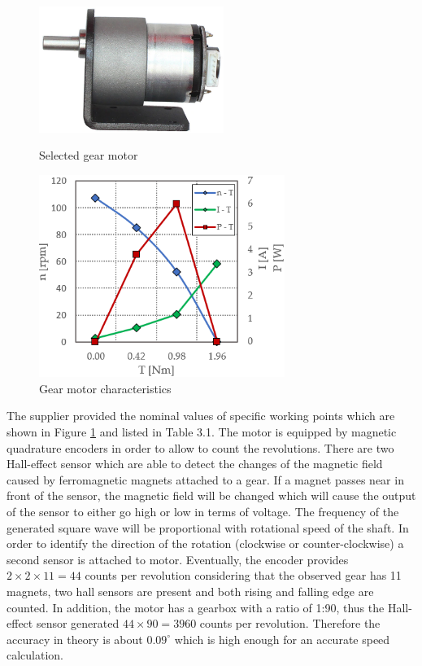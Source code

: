 \documentclass[12pt,english,twoside]{article}
\begin{document}
\begin{figure}[htb!]
	\centering
	\centering
	\includegraphics[width=6cm]{figures/gear_motor1}
	\caption{Selected gear motor}
	\label{gear_motor1}
	\endminipage\hfill
	\centering
	\includegraphics[width=8cm]{figures/gear_motor2}
	\caption{Gear motor characteristics}
	\label{gear_motor2}
	\endminipage\hfill
\end{figure}

The supplier provided the nominal values of specific working points which are shown in Figure \ref{gear_motor2} and listed in Table 3.1.
The motor is equipped by magnetic quadrature encoders in order to allow to count the revolutions. There are two Hall-effect sensor which are able to detect the changes of the magnetic field caused by ferromagnetic magnets attached to a gear. If a magnet passes near in front of the sensor, the magnetic field will be changed which will cause the output of the sensor to either go high or low in terms of voltage. The frequency of the generated square wave will be proportional with rotational speed of the shaft. In order to identify the direction of the rotation (clockwise or counter-clockwise) a second sensor is attached to motor. Eventually, the encoder provides $2 \times 2 \times 11 = 44$ counts per revolution considering that the observed gear has 11 magnets, two hall sensors are present and both rising and falling edge are counted. In addition, the motor has a gearbox with a ratio of 1:90, thus the Hall-effect sensor generated $44 \times 90 = 3960$ counts per revolution. Therefore the accuracy in theory is about $0.09^{\circ}$ which is high enough for an accurate speed calculation.
\end{document}
